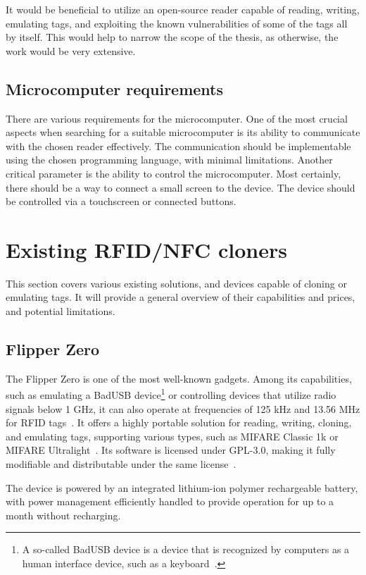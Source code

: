 It would be beneficial to utilize an open-source reader capable of reading, writing, emulating tags, and exploiting the known vulnerabilities of some of the tags all by itself. This would help to narrow the scope of the thesis, as otherwise, the work would be very extensive.

\subsection{Microcomputer requirements}

There are various requirements for the microcomputer. One of the most crucial aspects when searching for a suitable microcomputer is its ability to communicate with the chosen reader effectively. The communication should be implementable using the chosen programming language, with minimal limitations. Another critical parameter is the ability to control the microcomputer. Most certainly, there should be a way to connect a small screen to the device. The device should be controlled via a touchscreen or connected buttons.


\section{Existing RFID/NFC cloners}

This section covers various existing solutions, and devices capable of cloning or emulating tags. It will provide a general overview of their capabilities and prices, and potential limitations.

\subsection{Flipper Zero}

The Flipper Zero is one of the most well-known gadgets. Among its capabilities, such as emulating a BadUSB device\footnote{A so-called BadUSB device is a device that is recognized by computers as a human interface device, such as a keyboard~\cite{badusb}.} or controlling devices that utilize radio signals below 1 GHz, it can also operate at frequencies of 125 kHz and 13.56 MHz for RFID tags~\cite{flipper}. It offers a highly portable solution for reading, writing, cloning, and emulating tags, supporting various types, such as MIFARE Classic 1k or MIFARE Ultralight~\cite{flipperreading}.  Its software is licensed under GPL-3.0, making it fully modifiable and distributable under the same license~\cite{githubflipper}.

The device is powered by an integrated lithium-ion polymer rechargeable battery, with power management efficiently handled to provide operation for up to a month without recharging.~\cite{flipperpower}

